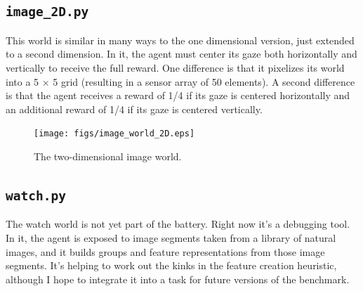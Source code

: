 \subsection{\texttt{image\_2D.py}}

This world is similar in many ways to the one dimensional version, just extended to a second dimension. In it, the agent must center its gaze both horizontally and vertically to receive the full reward. One difference is that it pixelizes its world into a 5 $\times$ 5 grid (resulting in a sensor array of 50 elements). A second difference is that the agent receives a reward of 1/4 if its gaze is centered horizontally and an additional reward of 1/4 if its gaze is centered vertically. 

\begin{figure}
\centering
\texttt{[image: figs/image\_world\_2D.eps]}
\caption{The two-dimensional image world.}
\label{image_2D}
\end{figure}


\subsection{\texttt{watch.py}}

The watch world is not yet part of the battery. Right now it's a debugging tool. In it, the agent is exposed to image segments taken from a library of natural images, and it builds groups and feature representations from those image segments. It's helping to work out the kinks in the feature creation heuristic, although I hope to integrate it into a task for future versions of the benchmark.
